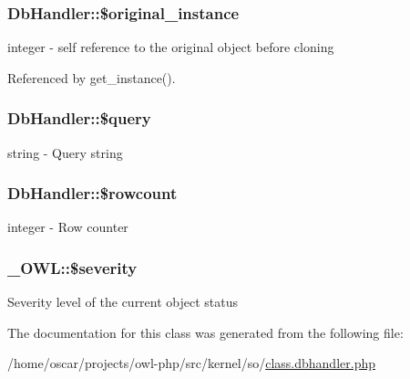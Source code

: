 \subsubsection[{\$original\_\-instance}]{\setlength{\rightskip}{0pt plus 5cm}DbHandler::\$original\_\-instance}\label{classDbHandler_a495ca4030e7ca7d5e8c7e2604e042dfe}
integer -\/ self reference to the original object before cloning 

Referenced by get\_\-instance().

\subsubsection[{\$query}]{\setlength{\rightskip}{0pt plus 5cm}DbHandler::\$query}\label{classDbHandler_ad671b5596b37dac6d48a660a07775965}
string -\/ Query string 
\subsubsection[{\$rowcount}]{\setlength{\rightskip}{0pt plus 5cm}DbHandler::\$rowcount}\label{classDbHandler_a56a7ae4bd7d842c85f3fe8052aecbfef}
integer -\/ Row counter 
\subsubsection[{\$severity}]{\setlength{\rightskip}{0pt plus 5cm}\_\-OWL::\$severity}\label{class__OWL_ad26b40a9dbbacb33e299b17826f8327c}
Severity level of the current object status 

The documentation for this class was generated from the following file:\begin{DoxyCompactItemize}
\item 
/home/oscar/projects/owl-\/php/src/kernel/so/\hyperlink{class_8dbhandler_8php}{class.dbhandler.php}\end{DoxyCompactItemize}

